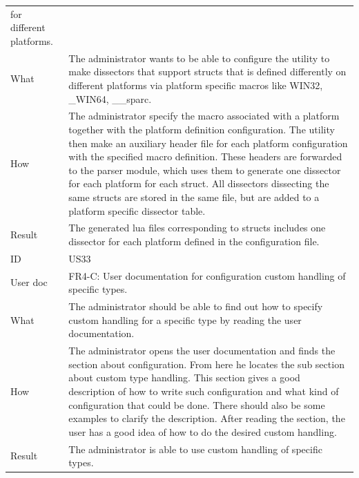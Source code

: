 \begin{table}[htbp]
{\begin{tabularx}{1.2\textwidth}{l X}
	for different platforms. \\
	What & The administrator wants to be able to configure the \gls{utility} to make \glspl{dissector} that support \glspl{struct} that is defined differently on different platforms via platform specific
	macros like WIN32, \_WIN64, \_\_sparc. \\
	How & The administrator specify the macro associated with a platform together with the platform definition configuration. The \gls{utility} then make an auxiliary \gls{header} file for each 
	platform configuration with the specified macro definition. These \glspl{header} are forwarded to the \gls{parser} module, which uses them to generate
  	one \gls{dissector} for each platform for each \gls{struct}. All \glspl{dissector} dissecting the same \glspl{struct} are stored in the same file, but are added to a platform specific \gls{dissector} table. \\
	Result & The generated \Gls{lua} files corresponding to \glspl{struct} includes one \gls{dissector} for each platform defined in the configuration file. \\
	\midrule
	ID & US33 \\
	User doc & FR4-C: User documentation for configuration custom handling of specific types. \\
	What & The administrator should be able to find out how to specify custom handling for a specific type by reading the user documentation. \\
	How &	 The administrator opens the user documentation and finds the section about configuration. From here he locates the sub section about custom type handling. 
	This section gives a good description of how to write such configuration and what kind of configuration that could be done. There should also be some examples to clarify
	the description. After reading the section, the user has a good idea of how to do the desired custom handling. \\ 
	Result & The administrator is able to use custom handling of specific types. \\
	\bottomrule
\end{tabularx}}
\end{table}

